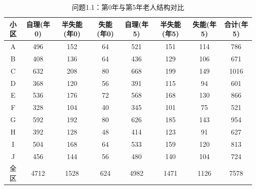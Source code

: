 \begin{table}[h]
\centering
\caption{问题1.1：第0年与第5年老人结构对比}
\begin{tabular}{|c|c|c|c|c|c|c|c|}
\hline
小区 & 自理(年0) & 半失能(年0) & 失能(年0) & 自理(年5) & 半失能(年5) & 失能(年5) & 合计(年5) \\
\hline
A & 496 & 152 & 64 & 521 & 151 & 114 & 786 \\
B & 408 & 136 & 64 & 436 & 129 & 106 & 671 \\
C & 632 & 208 & 80 & 668 & 199 & 149 & 1016 \\
D & 368 & 120 & 56 & 391 & 115 & 94 & 601 \\
E & 536 & 176 & 72 & 568 & 168 & 130 & 866 \\
F & 328 & 104 & 40 & 345 & 101 & 75 & 521 \\
G & 592 & 192 & 80 & 626 & 185 & 143 & 954 \\
H & 392 & 128 & 48 & 414 & 123 & 91 & 627 \\
I & 504 & 168 & 64 & 533 & 159 & 120 & 813 \\
J & 456 & 144 & 56 & 480 & 140 & 104 & 724 \\
全区 & 4712 & 1528 & 624 & 4982 & 1471 & 1126 & 7578 \\
\hline
\end{tabular}
\end{table}
